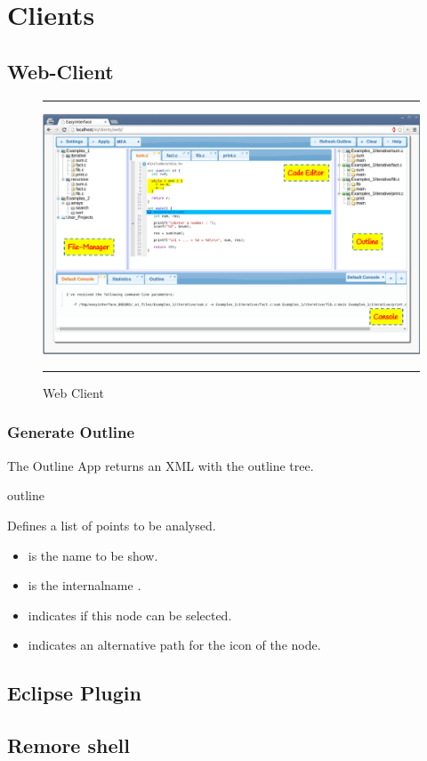 {%
}

\chapter{\ei Clients}
\label{ch:clients}


\section{Web-Client}
\label{ch:clients:web}

\begin{figure}[t]
\hrule\smallskip
\begin{center}
\includegraphics[width=1\textwidth]{fig/webclient.pdf}
\end{center}
\caption{\ei Web Client}
\label{fig:webclient}
\hrule
\end{figure}


\subsection{Generate Outline}
\label{ch:clients:web:outline}

The Outline App returns an XML with the outline tree.

\bigskip
\xmlstruct
{outline}
{
%
  Defines a list of points to be analysed.
\begin{itemize}
  \item {} is the name to be show.
   \item {} is the internalname .
\item {} indicates if this node can be
  selected.
\item {} indicates an alternative path for the icon
  of the node.

\end{itemize}
%
}
{}




\section{Eclipse Plugin}
\label{ch:clients:eclipse}

\section{Remore shell}
\label{ch:clients:shell}
